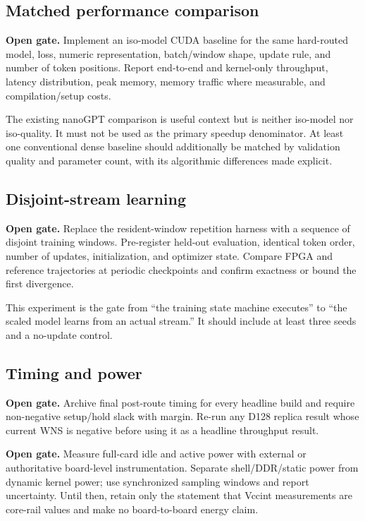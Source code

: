 \documentclass[10pt]{article}
\newcommand{\gate}[1]{\textcolor{orange!55!black}{\textbf{Open gate.} #1}}
\begin{document}
\subsection{Matched performance comparison}

\gate{Implement an iso-model CUDA baseline for the same hard-routed model, loss,
numeric representation, batch/window shape, update rule, and number of token
positions.  Report end-to-end and kernel-only throughput, latency distribution,
peak memory, memory traffic where measurable, and compilation/setup costs.}

The existing nanoGPT comparison is useful context but is neither iso-model nor
iso-quality.  It must not be used as the primary speedup denominator.  At least
one conventional dense baseline should additionally be matched by validation
quality and parameter count, with its algorithmic differences made explicit.

\subsection{Disjoint-stream learning}

\gate{Replace the resident-window repetition harness with a sequence of disjoint
training windows.  Pre-register held-out evaluation, identical token order,
number of updates, initialization, and optimizer state.  Compare FPGA and
reference trajectories at periodic checkpoints and confirm exactness or bound
the first divergence.}

This experiment is the gate from ``the training state machine executes'' to
``the scaled model learns from an actual stream.''  It should include at least
three seeds and a no-update control.

\subsection{Timing and power}

\gate{Archive final post-route timing for every headline build and require
non-negative setup/hold slack with margin.  Re-run any D128 replica result whose
current WNS is negative before using it as a headline throughput result.}

\gate{Measure full-card idle and active power with external or authoritative
board-level instrumentation.  Separate shell/DDR/static power from dynamic
kernel power; use synchronized sampling windows and report uncertainty.  Until
then, retain only the statement that Vccint measurements are core-rail values
and make no board-to-board energy claim.}
\end{document}
